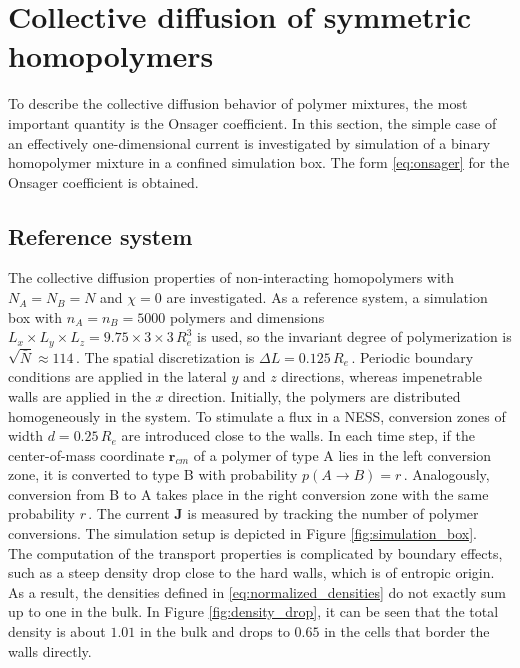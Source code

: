 \documentclass[bachelor,       %
               twoside,        %
               BCOR10mm,       %
               ngerman, english %
               ]{GAUBM}
\begin{document}
\chapter{Collective diffusion of symmetric homopolymers}
\label{chap:colldiff}

To describe the collective diffusion behavior of polymer mixtures, the most important quantity is the Onsager coefficient. In this section, the simple case of an effectively one-dimensional current is investigated by simulation of a binary homopolymer mixture in a confined simulation box. The form \eqref{eq:onsager} for the Onsager coefficient is obtained. 

\section{Reference system}

The collective diffusion properties of non-interacting homopolymers with $N_A=N_B=N$ and $\chi=0$ are investigated. As a reference system, a simulation box with $n_A=n_B=5000$ polymers and dimensions $L_x\times L_y\times L_z=9.75\times3\times3\,R_e^3$ is used, so the invariant degree of polymerization is $\sqrt{\bar{N}}\approx 114\,$. The spatial discretization is $\Delta L=0.125\,R_e\,$.  Periodic boundary conditions are applied in the lateral $y$ and $z$ directions, whereas impenetrable walls are applied in the $x$ direction. Initially, the polymers are distributed homogeneously in the system. To stimulate a flux in a \ac{NESS}, conversion zones of width $d=0.25\,R_e$ are introduced close to the walls. In each time step, if the center-of-mass coordinate $\mathbf r_{cm}$ of a polymer of type A lies in the left conversion zone, it is converted to type B with probability $p(A\rightarrow B)=r\,$. Analogously, conversion from B to A takes place in the right conversion zone with the same probability $r\,$. The current $\mathbf J$ is measured by tracking the number of polymer conversions. The simulation setup is depicted in Figure \ref{fig:simulation_box}. \\
The computation of the transport properties is complicated by boundary effects, such as a steep density drop close to the hard walls, which is of entropic origin. As a result, the densities defined in \eqref{eq:normalized_densities} do not exactly sum up to one in the bulk. In Figure \ref{fig:density_drop}, it can be seen that the total density is about $1.01$ in the bulk and drops to $0.65$ in the cells that border the walls directly.
\end{document}
